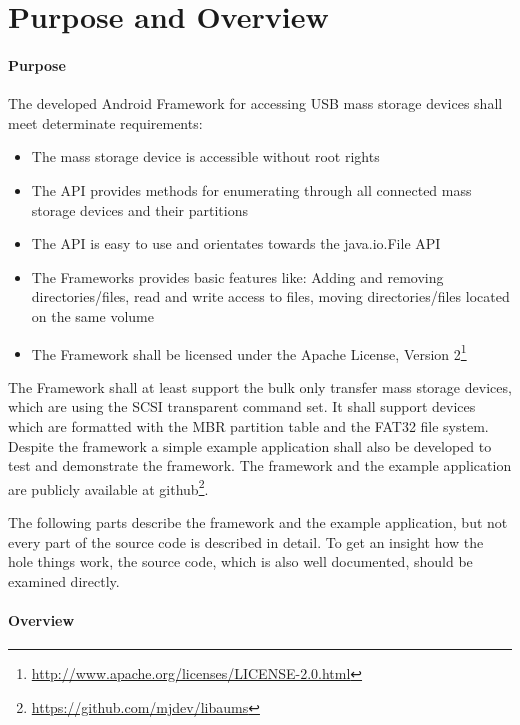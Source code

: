 \chapter{Purpose and Overview}

\subsubsection{Purpose}
\label{implementation_purpose}

The developed Android Framework for accessing USB mass storage devices shall meet determinate requirements:

\begin{itemize}
\item The mass storage device is accessible without root rights
\item The API provides methods for enumerating through all connected mass storage devices and their partitions
\item The API is easy to use and orientates towards the java.io.File API
\item The Frameworks provides basic features like: Adding and removing directories/files, read and write access to files, moving directories/files located on the same volume
\item The Framework shall be licensed under the Apache License, Version 2\footnote{\url{http://www.apache.org/licenses/LICENSE-2.0.html}}
\end{itemize}

The Framework shall at least support the bulk only transfer mass storage devices, which are using the SCSI transparent command set. It shall support devices which are formatted with the MBR partition table and the FAT32 file system. Despite the framework a simple example application shall also be developed to test and demonstrate the framework. The framework and the example application are publicly available at github\footnote{\url{https://github.com/mjdev/libaums}}.

The following parts describe the framework and the example application, but not every part of the source code is described in detail. To get an insight how the hole things work, the source code, which is also well documented, should be examined directly.

\subsubsection{Overview}
\label{implementation_overview}

